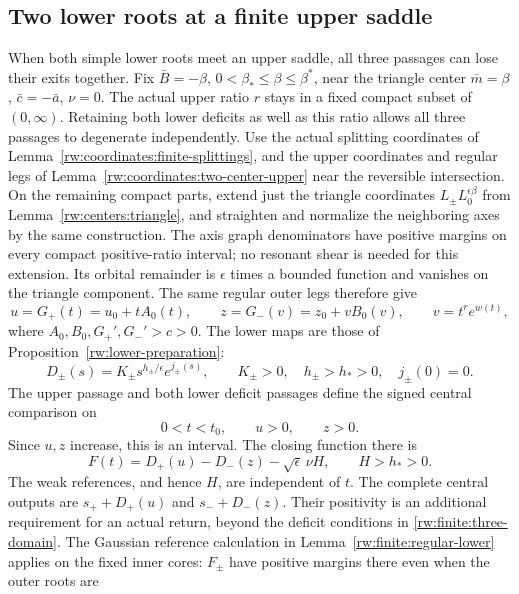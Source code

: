 \subsection{Two lower roots at a finite upper saddle}
\label{rw:finite:three-saddle}

When both simple lower roots meet an upper saddle, all three
passages can lose their exits together. Fix $\bar B=-\beta$,
$0<\beta_*\le\beta\le\beta^*$, near the triangle center
$\bar m=\beta$, $\bar c=-\bar a$, $\nu=0$. The actual upper
ratio $r$ stays in a fixed compact subset of $(0,\infty)$. Retaining
both lower deficits as well as this ratio allows all three passages
to degenerate independently. Use the actual splitting coordinates of Lemma~\ref{rw:coordinates:finite-splittings}, and the
upper coordinates and regular legs of
Lemma~\ref{rw:coordinates:two-center-upper} near the reversible
intersection. On the remaining compact parts, extend just the triangle
coordinates $L_\pm L_0^{\epsilon\beta}$ from
Lemma~\ref{rw:centers:triangle}, and straighten and normalize the
neighboring axes by the same construction. The axis graph denominators
have positive margins on every compact positive-ratio interval; no
resonant shear is needed for this extension. Its orbital remainder is
$\epsilon$ times a bounded function and vanishes on the triangle
component. The same regular outer legs therefore give
\[
 u=G_+(t)=u_0+tA_0(t),\qquad
 z=G_-(v)=z_0+vB_0(v),\qquad v=t^re^{w(t)},
\]
where $A_0,B_0,G_+',G_-'>c>0$. The lower maps are those of
Proposition~\ref{rw:lower-preparation}:
\begin{equation}\label{rw:finite:three-powers}
 D_\pm(s)=K_\pm s^{h_\pm/\epsilon}e^{j_\pm(s)},\qquad
 K_\pm>0,\quad h_\pm>h_*>0,\quad j_\pm(0)=0.
\end{equation}
The upper passage and both lower deficit passages define the signed
central comparison on
\begin{equation}\label{rw:finite:three-domain}
 0<t<t_0,\qquad u>0,\qquad z>0.
\end{equation}
Since $u,z$ increase, this is an interval. The closing function there is
\[
 F(t)=D_+(u)-D_-(z)-\sqrt\epsilon\,\nu H,\qquad H>h_*>0.
\]
The weak references, and hence $H$, are independent of $t$.
The complete central outputs are $s_++D_+(u)$ and $s_-+D_-(z)$.
Their positivity is an additional requirement for an actual return,
beyond the deficit conditions in \eqref{rw:finite:three-domain}.
The Gaussian reference calculation in
Lemma~\ref{rw:finite:regular-lower} applies on the fixed inner cores:
$F_\pm$ have positive margins there even when the outer roots are

